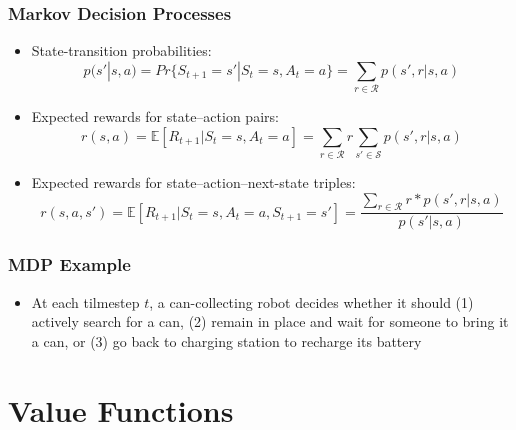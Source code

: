 \documentclass{beamer}
\begin{document}

\begin{frame}
\frametitle{Markov Decision Processes}
\begin{itemize}
\item State-transition probabilities:
\begin{equation}
p(s' | s,a) = Pr\{S_{t+1} = s' | S_t = s, A_t = a\} =  \sum_{r \in \mathscr{R} } p(s',r | s,a)
\nonumber
\end{equation}
\item Expected rewards for state--action pairs:
\begin{equation}
r(s,a) = \mathbb{E}[R_{t+1} | S_t = s, A_t = a] = \sum_{r \in \mathscr{R} } r \sum_{s' \in \mathscr{S} } p(s',r | s,a)
\nonumber
\end{equation}
\item Expected rewards for state--action--next-state triples:
\begin{equation}
r(s,a,s') = \mathbb{E}[R_{t+1} | S_t = s, A_t = a, S_{t+1}  = s'] =  \dfrac{ \sum_{r \in \mathscr{R} } r*p(s',r | s,a)}{p(s'| s,a)}
\nonumber
\end{equation}
\end{itemize}
\end{frame}


\begin{frame}
\frametitle{MDP Example}
\begin{itemize}
\item At each tilmestep $t$, a can-collecting robot decides whether it should (1) actively search for a can, 
(2) remain in place and wait for someone to bring it a can, or (3) go back to charging station to recharge its battery

\end{itemize}
\end{frame}


\section{Value Functions} %

\end{document}
